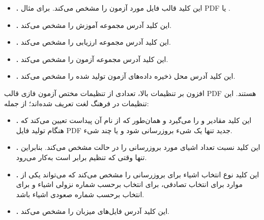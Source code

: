 \begin{itemize}

\item{
	\textbf{.}
این کلید قالب فایل مورد آزمون را مشخص می‌کند. برای مثال \gls{PDF} یا .

}

\item{
	\textbf{.}
این کلید آدرس مجموعه آموزش را مشخص می‌کند.

}

\item{
	\textbf{.}
این کلید آدرس مجموعه ارزیابی را مشخص می‌کند.

}

\item{
	\textbf{.}
این کلید آدرس مجموعه آزمون را مشخص می‌کند.

}

\item{
	\textbf{.}
	این کلید آدرس محل ذخیره داده‌های آزمون تولید شده را مشخص می‌کند.
	
}

\end{itemize}

افزون بر تنظیمات بالا، تعدادی از تنظیمات مختص آزمون فازی قالب \gls{PDF} هستند. این تنظیمات در فرهنگ لغت 
تعریف شده‌اند؛ از جمله:
 

\begin{itemize}
\item{
\textbf{.}
این کلید مقادیر  و  را می‌‌گیرد و همان‌طور که از نام آن پیداست تعیین می‌کند که هنگام تولید فایل \gls{PDF} جدید تنها یک شیء بروزرسانی شود و یا چند شیء.
 

}


\item{
	\textbf{.}
	این کلید نسبت تعداد اشیای مورد بروزرسانی را در حالت  مشخص می‌کند. بنابراین تنها وقتی که تنظیم  برابر  است به‌کار می‌رود.   
	
}


\item{
	\textbf{.}
	این کلید نوع انتخاب اشیاء برای بروزرسانی را مشخص می‌کند که می‌تواند یکی از موارد 
	برای انتخاب تصادفی، 
	برای انتخاب برحسب شماره نزولی اشیاء و   
	برای انتخاب برحسب شماره صعودی اشیاء باشد.
}


\item{
	\textbf{.}
	این کلید آدرس فایل‌های میزبان را مشخص می‌کند. 
}

\end{itemize}



